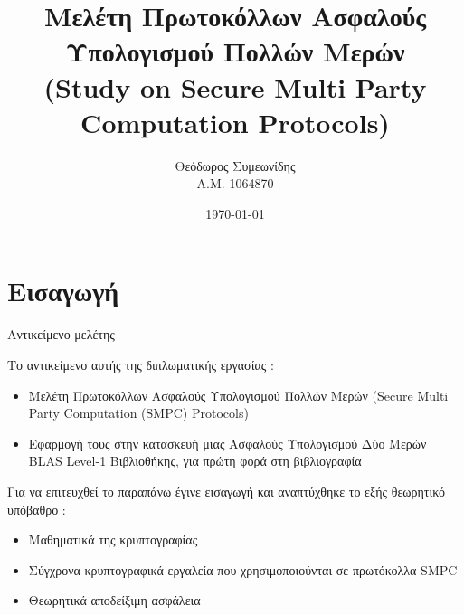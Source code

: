\documentclass[10pt]{beamer}
\title[Μελέτη Πρωτοκόλλων Ασφαλούς Υπολογισμού Πολλών Μερών]{Μελέτη Πρωτοκόλλων Ασφαλούς Υπολογισμού Πολλών Μερών \\ (Study on Secure Multi Party Computation Protocols)}%
\author[Θεόδωρος Συμεωνίδης Α.Μ. 1064870]{Θεόδωρος Συμεωνίδης \\ Α.Μ. 1064870}
\institute[]{Τμήμα Μηχανικών Η/Υ και Πληροφορικής \\ Πανεπιστήμιο Πατρών}
\date[\textcolor{white}{Τμήμα Μηχανικών Η/Υ και Πληροφορικής}]
{\today}
\begin{document}
    \begin{frame}
        \titlepage
    \end{frame}

    \section{Εισαγωγή}
    \begin{frame}{Αντικείμενο μελέτης}
        \begin{block}{}
            Το αντικείμενο αυτής της διπλωματικής εργασίας :
            \begin{itemize}
                \item Μελέτη Πρωτοκόλλων Ασφαλούς Υπολογισμού Πολλών Μερών (Secure Multi Party Computation (SMPC) Protocols)
                \item Εφαρμογή τους στην κατασκευή μιας Ασφαλούς Υπολογισμού Δύο Μερών BLAS Level-1 Βιβλιοθήκης, για πρώτη φορά στη βιβλιογραφία
            \end{itemize}
        \end{block}
        \begin{block}{}
            Για να επιτευχθεί το παραπάνω έγινε εισαγωγή και αναπτύχθηκε το εξής θεωρητικό υπόβαθρο :
            \begin{itemize}
                \item Μαθηματικά της κρυπτογραφίας
                \item Σύγχρονα κρυπτογραφικά εργαλεία που χρησιμοποιούνται σε πρωτόκολλα SMPC
                \item Θεωρητικά αποδείξιμη ασφάλεια
            \end{itemize}
        \end{block}
    \end{frame}
\end{document}
